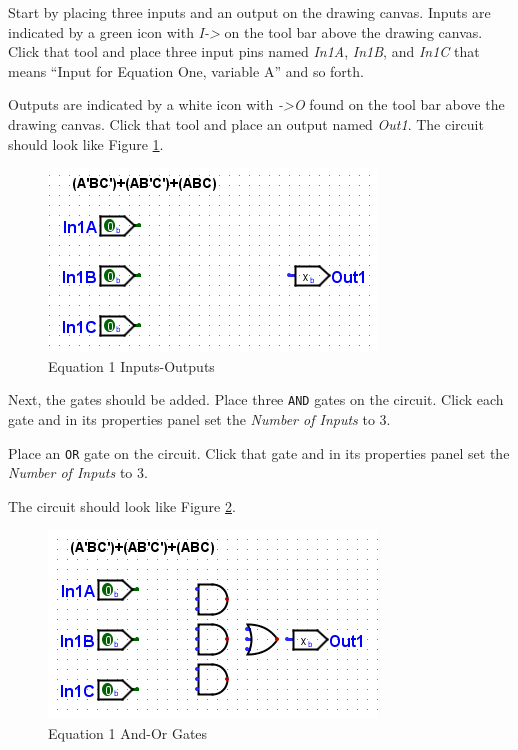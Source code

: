 Start by placing three inputs and an output on the drawing canvas. Inputs are indicated by a green icon with \textit{I->} on the tool bar above the drawing canvas. Click that tool and place three input pins named \textit{In1A}, \textit{In1B}, and \textit{In1C} \textemdash that means ``Input for Equation One, variable A'' and so forth. 

Outputs are indicated by a white icon with \textit{->O} found on the tool bar above the drawing canvas. Click that tool and place an output named \textit{Out1}. The circuit should look like Figure \ref{fig:bool-01}.

\begin{figure}[H]
	\centering
	\includegraphics[width=\maxwidth{.95\linewidth}]{gfx/bool-01}
	\caption{Equation 1 Inputs-Outputs}
	\label{fig:bool-01}
\end{figure}

Next, the gates should be added. Place three \texttt{AND} gates on the circuit. Click each gate and in its properties panel set the \textit{Number of Inputs} to 3. 

Place an \texttt{OR} gate on the circuit. Click that gate and in its properties panel set the \textit{Number of Inputs} to 3.

The circuit should look like Figure \ref{fig:bool-02}.

\begin{figure}[H]
	\centering
	\includegraphics[width=\maxwidth{.95\linewidth}]{gfx/bool-02}
	\caption{Equation 1 And-Or Gates}
	\label{fig:bool-02}
\end{figure}

